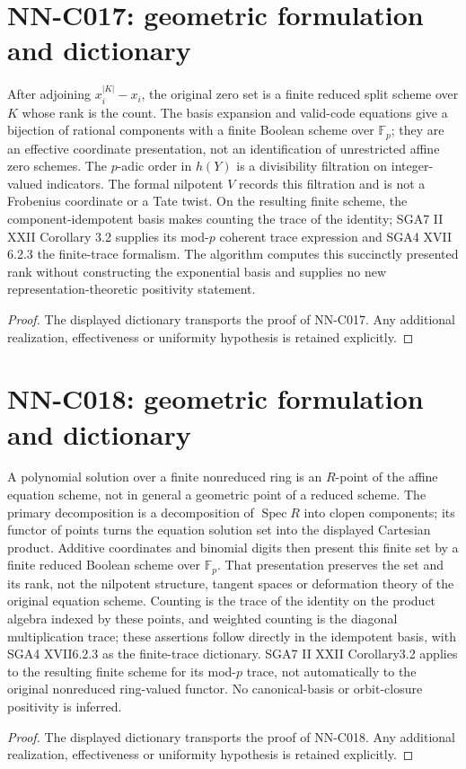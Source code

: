 \section{NN-C017: geometric formulation and dictionary}
\begin{geometricstatement}[NN-C017]
After adjoining $x_i^{|K|}-x_i$, the original zero set is a finite reduced split scheme over $K$ whose rank is the count. The basis expansion and valid-code equations give a bijection of rational components with a finite Boolean scheme over $\mathbb F_p$; they are an effective coordinate presentation, not an identification of unrestricted affine zero schemes. The $p$-adic order in $h(Y)$ is a divisibility filtration on integer-valued indicators. The formal nilpotent $V$ records this filtration and is not a Frobenius coordinate or a Tate twist. On the resulting finite scheme, the component-idempotent basis makes counting the trace of the identity; SGA7 II XXII Corollary 3.2 supplies its mod-$p$ coherent trace expression and SGA4 XVII 6.2.3 the finite-trace formalism. The algorithm computes this succinctly presented rank without constructing the exponential basis and supplies no new representation-theoretic positivity statement.
\end{geometricstatement}
\begin{proof} The displayed dictionary transports the proof of NN-C017. Any additional realization, effectiveness or uniformity hypothesis is retained explicitly.\end{proof}


\section{NN-C018: geometric formulation and dictionary}
\begin{geometricstatement}[NN-C018]
A polynomial solution over a finite nonreduced ring is an $R$-point of the affine equation scheme, not in general a geometric point of a reduced scheme. The primary decomposition is a decomposition of $\operatorname{Spec}R$ into clopen components; its functor of points turns the equation solution set into the displayed Cartesian product. Additive coordinates and binomial digits then present this finite set by a finite reduced Boolean scheme over $\mathbb F_p$. That presentation preserves the set and its rank, not the nilpotent structure, tangent spaces or deformation theory of the original equation scheme. Counting is the trace of the identity on the product algebra indexed by these points, and weighted counting is the diagonal multiplication trace; these assertions follow directly in the idempotent basis, with SGA4 XVII6.2.3 as the finite-trace dictionary. SGA7 II XXII Corollary3.2 applies to the resulting finite scheme for its mod-$p$ trace, not automatically to the original nonreduced ring-valued functor. No canonical-basis or orbit-closure positivity is inferred.
\end{geometricstatement}
\begin{proof} The displayed dictionary transports the proof of NN-C018. Any additional realization, effectiveness or uniformity hypothesis is retained explicitly.\end{proof}



